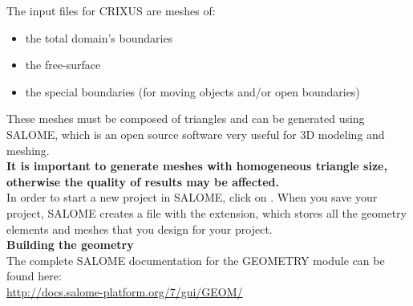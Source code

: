 \documentclass{../GPUSPHtemplate}
\begin{document}
The input files for CRIXUS are meshes of:
\begin{itemize}
\item the total domain's boundaries
\item the free-surface
\item the special boundaries (for moving objects 
and/or open boundaries)
\end{itemize}
These meshes must be composed of triangles and can 
be generated using SALOME, which is an open source 
software very useful for 3D modeling and meshing.\\

\textbf{It is important to generate meshes with homogeneous 
triangle size, otherwise the quality of results may be affected.}\\


In order to start a new project in SALOME, click on . 
When you save your project, SALOME creates a file with the 
 extension, which stores all the geometry elements 
and meshes that you design for your project.\\

\textbf{Building the geometry}\\

The complete SALOME documentation for the GEOMETRY module can be found here:\\
\url{http://docs.salome-platform.org/7/gui/GEOM/}\\
\end{document}

